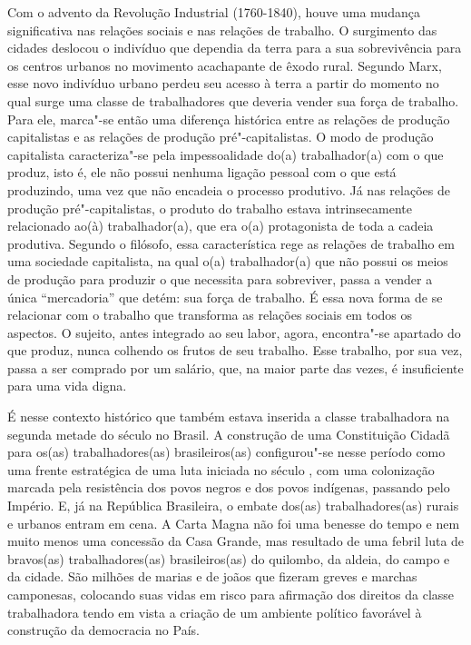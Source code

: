 Com o advento da Revolução Industrial (1760-1840), houve uma mudança
significativa nas relações sociais e nas relações de trabalho. O
surgimento das cidades deslocou o indivíduo que dependia da terra para a
sua sobrevivência para os centros urbanos no movimento acachapante de
êxodo rural. Segundo Marx, esse novo indivíduo urbano perdeu seu acesso
à terra a partir do momento no qual surge uma classe de trabalhadores
que deveria vender sua força de trabalho.
Para ele, marca"-se então uma diferença
histórica entre as relações de produção capitalistas e as relações de
produção pré"-capitalistas. O modo de produção capitalista caracteriza"-se
pela impessoalidade do(a) trabalhador(a) com o que produz, isto é, ele
não possui nenhuma ligação pessoal com o que está produzindo, uma vez
que não encadeia o processo produtivo. Já nas relações de produção
pré"-capitalistas, o produto do trabalho estava intrinsecamente
relacionado ao(à) trabalhador(a), que era o(a) protagonista de toda a
cadeia produtiva. Segundo o filósofo, essa característica rege as
relações de trabalho em uma sociedade capitalista, na qual o(a)
trabalhador(a) que não possui os meios de produção para produzir o que
necessita para sobreviver, passa a vender a única ``mercadoria'' que
detém: sua força de trabalho. É essa nova forma de se relacionar com o
trabalho que transforma as relações sociais em todos os aspectos. O
sujeito, antes integrado ao seu labor, agora, encontra"-se apartado do
que produz, nunca colhendo os frutos de seu trabalho. Esse trabalho, por
sua vez, passa a ser comprado por um salário, que, na maior parte das
vezes, é insuficiente para uma vida digna.

É nesse contexto histórico que também estava inserida a classe
trabalhadora na segunda metade do século  no Brasil. A construção de
uma Constituição Cidadã para os(as) trabalhadores(as) brasileiros(as)
configurou"-se nesse período como uma frente estratégica de uma luta
iniciada no século , com uma colonização marcada pela resistência dos
povos negros e dos povos indígenas, passando pelo Império. E, já na
República Brasileira, o embate dos(as) trabalhadores(as) rurais e
urbanos entram em cena. A Carta Magna não foi uma benesse do tempo e nem
muito menos uma concessão da Casa Grande, mas resultado de uma febril
luta de bravos(as) trabalhadores(as) brasileiros(as) do quilombo, da
aldeia, do campo e da cidade. São milhões de marias e de joãos que
fizeram greves e marchas camponesas, colocando suas vidas em risco para
afirmação dos direitos da classe trabalhadora tendo em vista a criação
de um ambiente político favorável à construção da democracia no País.


